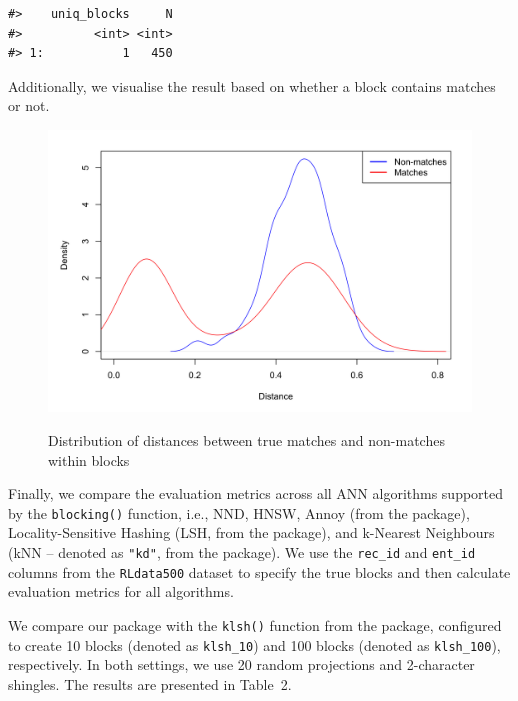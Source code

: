 \begin{verbatim}
#>    uniq_blocks     N
#>          <int> <int>
#> 1:           1   450
\end{verbatim}

Additionally, we visualise the result based on whether a block contains
matches or not.

\begin{figure}
\includegraphics[width=0.8\linewidth,alt={A density plot of distances between units that are true matches (red) and non-matches (blue) within blocks created by the \CRANpkg{blocking}. The distribution of distance for matches is bimodal. There is a group of units that are true matches where the distance between them is small (less than 0.2), whilst for the second group, the distance is similar to true non-matches (between 0.4 and 0.6). This distance may be used as additional information for deduplication (and record linkage) studies.}]{./figures/fig-1-density} \caption{Distribution of distances between true matches and non-matches within blocks}\label{fig:penguins-alison}
\end{figure}

Finally, we compare the evaluation metrics across all ANN algorithms
supported by the \texttt{blocking()} function, i.e., NND, HNSW, Annoy (from the
 package), Locality-Sensitive Hashing (LSH, from the
 package), and k-Nearest Neighbours (kNN -- denoted as
\texttt{"kd"}, from the  package). We use the \texttt{rec\_id} and
\texttt{ent\_id} columns from the \texttt{RLdata500} dataset to specify the true blocks
and then calculate evaluation metrics for all algorithms.

We compare our package with the \texttt{klsh()} function from the
 package, configured to create 10 blocks (denoted as
\texttt{klsh\_10}) and 100 blocks (denoted as \texttt{klsh\_100}), respectively. In both
settings, we use 20 random projections and 2-character shingles. The
results are presented in Table~2.

